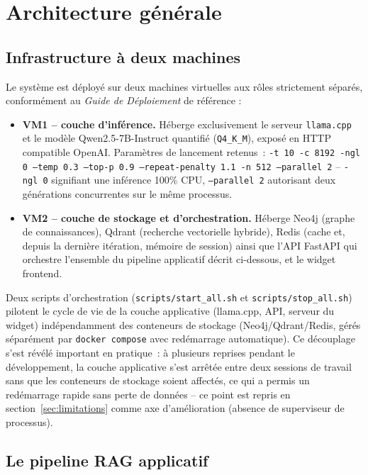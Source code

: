 \section{Architecture générale}

\subsection{Infrastructure à deux machines}

Le système est déployé sur deux machines virtuelles aux rôles strictement séparés, conformément au \emph{Guide de Déploiement} de référence :

\begin{sloppypar}
\begin{itemize}
\item \textbf{VM1 -- couche d'inférence.} Héberge exclusivement le serveur \texttt{llama.cpp} et le modèle Qwen2.5-7B-Instruct quantifié (\texttt{Q4\_K\_M}), exposé en HTTP compatible OpenAI. Paramètres de lancement retenus~: \texttt{-t 10 -c 8192 -ngl 0 --temp 0.3 --top-p 0.9 --repeat-penalty 1.1 -n 512 --parallel 2} -- \texttt{-ngl 0} signifiant une inférence 100\% CPU, \texttt{--parallel 2} autorisant deux générations concurrentes sur le même processus.
\item \textbf{VM2 -- couche de stockage et d'orchestration.} Héberge Neo4j (graphe de connaissances), Qdrant (recherche vectorielle hybride), Redis (cache et, depuis la dernière itération, mémoire de session) ainsi que l'API FastAPI qui orchestre l'ensemble du pipeline applicatif décrit ci-dessous, et le widget frontend.
\end{itemize}
\end{sloppypar}

Deux scripts d'orchestration (\texttt{scripts/start\_all.sh} et \texttt{scripts/stop\_all.sh}) pilotent le cycle de vie de la couche applicative (llama.cpp, API, serveur du widget) indépendamment des conteneurs de stockage (Neo4j/Qdrant/Redis, gérés séparément par \texttt{docker compose} avec redémarrage automatique). Ce découplage s'est révélé important en pratique~: à plusieurs reprises pendant le développement, la couche applicative s'est arrêtée entre deux sessions de travail sans que les conteneurs de stockage soient affectés, ce qui a permis un redémarrage rapide sans perte de données -- ce point est repris en section~\ref{sec:limitations} comme axe d'amélioration (absence de superviseur de processus).

\subsection{Le pipeline RAG applicatif}

